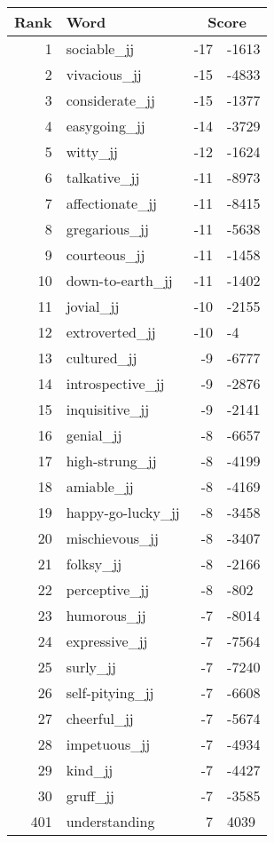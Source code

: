 \begin{longtable}[!htbp]{| rlr@{.}l |}
    \hline
    \textbf{Rank} & \textbf{Word} & \multicolumn{2}{c|}{\textbf{Score}} \\
    \hline
    \endhead
    1 & sociable\_jj & -17 & -1613 \\
    2 & vivacious\_jj & -15 & -4833 \\
    3 & considerate\_jj & -15 & -1377 \\
    4 & easygoing\_jj & -14 & -3729 \\
    5 & witty\_jj & -12 & -1624 \\
    6 & talkative\_jj & -11 & -8973 \\
    7 & affectionate\_jj & -11 & -8415 \\
    8 & gregarious\_jj & -11 & -5638 \\
    9 & courteous\_jj & -11 & -1458 \\
    10 & down-to-earth\_jj & -11 & -1402 \\
    11 & jovial\_jj & -10 & -2155 \\
    12 & extroverted\_jj & -10 & -4 \\
    13 & cultured\_jj & -9 & -6777 \\
    14 & introspective\_jj & -9 & -2876 \\
    15 & inquisitive\_jj & -9 & -2141 \\
    16 & genial\_jj & -8 & -6657 \\
    17 & high-strung\_jj & -8 & -4199 \\
    18 & amiable\_jj & -8 & -4169 \\
    19 & happy-go-lucky\_jj & -8 & -3458 \\
    20 & mischievous\_jj & -8 & -3407 \\
    21 & folksy\_jj & -8 & -2166 \\
    22 & perceptive\_jj & -8 & -802 \\
    23 & humorous\_jj & -7 & -8014 \\
    24 & expressive\_jj & -7 & -7564 \\
    25 & surly\_jj & -7 & -7240 \\
    26 & self-pitying\_jj & -7 & -6608 \\
    27 & cheerful\_jj & -7 & -5674 \\
    28 & impetuous\_jj & -7 & -4934 \\
    29 & kind\_jj & -7 & -4427 \\
    30 & gruff\_jj & -7 & -3585 \\
    401 & understanding & 7 & 4039 \\

\end{longtable}
